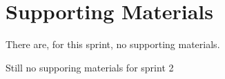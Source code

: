 
\chapter{Supporting Materials}
There are, for this sprint, no supporting materials.

Still no supporing materials for sprint 2

